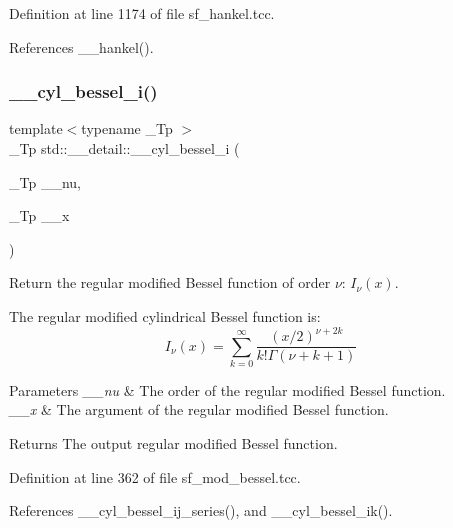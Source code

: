 Definition at line 1174 of file sf\+\_\+hankel.\+tcc.



References \+\_\+\+\_\+hankel().

\mbox{\label{namespacestd_1_1____detail_a72e3392d5c03c0bc8f2b5ffb8c1304b5}} 
\subsubsection{\texorpdfstring{\+\_\+\+\_\+cyl\+\_\+bessel\+\_\+i()}{\_\_cyl\_bessel\_i()}}
{\footnotesize\ttfamily template$<$typename \+\_\+\+Tp $>$ \\
\+\_\+\+Tp std\+::\+\_\+\+\_\+detail\+::\+\_\+\+\_\+cyl\+\_\+bessel\+\_\+i (\begin{DoxyParamCaption}\item[{\+\_\+\+Tp}]{\+\_\+\+\_\+nu,  }\item[{\+\_\+\+Tp}]{\+\_\+\+\_\+x }\end{DoxyParamCaption})}



Return the regular modified Bessel function of order $ \nu $\+: $ I_{\nu}(x) $. 

The regular modified cylindrical Bessel function is\+: \[ I_{\nu}(x) = \sum_{k=0}^{\infty} \frac{(x/2)^{\nu + 2k}}{k!\Gamma(\nu+k+1)} \]


\begin{DoxyParams}{Parameters}
{\em \+\_\+\+\_\+nu} & The order of the regular modified Bessel function. \\
\hline
{\em \+\_\+\+\_\+x} & The argument of the regular modified Bessel function. \\
\hline
\end{DoxyParams}
\begin{DoxyReturn}{Returns}
The output regular modified Bessel function. 
\end{DoxyReturn}


Definition at line 362 of file sf\+\_\+mod\+\_\+bessel.\+tcc.



References \+\_\+\+\_\+cyl\+\_\+bessel\+\_\+ij\+\_\+series(), and \+\_\+\+\_\+cyl\+\_\+bessel\+\_\+ik().



